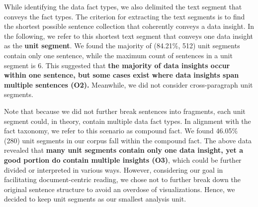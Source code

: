 While identifying the data fact types, we also delimited the text segment that conveys the fact types. The criterion for extracting the text segments is to find the shortest possible sentence collection that coherently conveys a data insight. In the following, we refer to this shortest text segment that conveys one data insight as the \textbf{unit segment}. We found the majority of (84.21\%, 512) unit segments contain only one sentence, while the maximum count of sentences in a unit segment is 6. This suggested that \textbf{the majority of data insights occur within one sentence, but some cases exist where data insights span multiple sentences (O2).} Meanwhile, we did not consider cross-paragraph unit segments.

Note that because we did not further break sentences into fragments, each unit segment could, in theory, contain multiple data fact types. In alignment with the fact taxonomy, we refer to this scenario as compound fact. We found 46.05\% (280) unit segments in our corpus fall within the compound fact. The above data revealed that \textbf{many unit segments contain only one data insight, yet a good portion do contain multiple insights (O3)}, which could be further divided or interpreted in various ways. However, considering our goal in facilitating document-centric reading, we chose not to further break down the original sentence structure to avoid an overdose of visualizations. Hence, we decided to keep unit segments as our smallest analysis unit.



